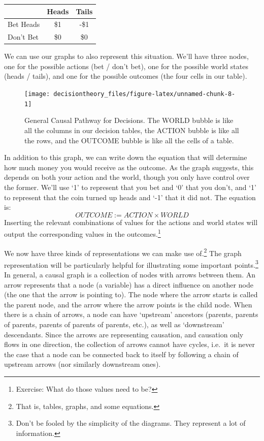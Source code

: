 \documentclass[]{tufte-book}
\begin{document}
\begin{longtable}[]{@{}lcc@{}}
\toprule
& Heads & Tails\tabularnewline
\midrule
\endhead
Bet Heads & \$1 & -\$1\tabularnewline
Don't Bet & \$0 & \$0\tabularnewline
\bottomrule
\end{longtable}

We can use our graphs to also represent this situation. We'll have three nodes, one for the possible actions (bet / don't bet), one for the possible world states (heads / tails), and one for the possible outcomes (the four cells in our table).

\begin{figure}
\texttt{[image: decisiontheory\_files/figure-latex/unnamed-chunk-8-1]} \caption[General Causal Pathway for Decisions]{General Causal Pathway for Decisions. The WORLD bubble is like all the columns in our decision tables, the ACTION bubble is like all the rows, and the OUTCOME bubble is like all the cells of a table.}\label{fig:unnamed-chunk-8}
\end{figure}

In addition to this graph, we can write down the equation that will determine how much money you would receive as the outcome. As the graph suggests, this depends on both your action and the world, though you only have control over the former. We'll use `1' to represent that you bet and `0' that you don't, and `1' to represent that the coin turned up heads and `-1' that it did not. The equation is:
\[
OUTCOME := ACTION \times WORLD
\]
Inserting the relevant combinations of values for the actions and world states will output the corresponding values in the outcomes.\footnote{Exercise: What do those values need to be?}

We now have three kinds of representations we can make use of.\footnote{That is, tables, graphs, and some equations.} The graph representation will be particularly helpful for illustrating some important points.\footnote{Don't be fooled by the simplicity of the diagrams. They represent a lot of information.} In general, a causal graph is a collection of nodes with arrows between them. An arrow represents that a node (a variable) has a direct influence on another node (the one that the arrow is pointing to). The node where the arrow starts is called the parent node, and the arrow where the arrow points is the child node. When there is a chain of arrows, a node can have `upstream' ancestors (parents, parents of parents, parents of parents of parents, etc.), as well as `downstream' descendants. Since the arrows are representing causation, and causation only flows in one direction, the collection of arrows cannot have cycles, i.e.~it is never the case that a node can be connected back to itself by following a chain of upstream arrows (nor similarly downstream ones).
\end{document}
